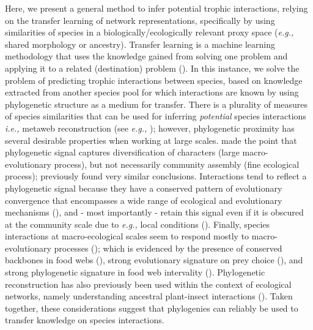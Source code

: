 \begin{refsection}
Here, we present a general method to infer potential trophic
interactions, relying on the transfer learning of network
representations, specifically by using similarities of species in a
biologically/ecologically relevant proxy space (\emph{e.g.,} shared
morphology or ancestry). Transfer learning is a machine learning
methodology that uses the knowledge gained from solving one problem and
applying it to a related (destination) problem (\cite{Torrey2010Transfer,
Pan2010Survey}). In this instance, we solve the problem of predicting
trophic interactions between species, based on knowledge extracted from
another species pool for which interactions are known by using
phylogenetic structure as a medium for transfer. There is a plurality of
measures of species similarities that can be used for inferring
\emph{potential} species interactions \emph{i.e.,} metaweb reconstruction
(see \emph{e.g.,} \cite{Morales-Castilla2015Inferring}); however, phylogenetic
proximity has several desirable properties when working at large scales.
\cite{Gerhold2015Phylogenetic} made the point that phylogenetic signal captures
diversification of characters (large macro-evolutionary process), but
not necessarily community assembly (fine ecological process);
\cite{Dormann2010Evolution} previously found very similar conclusions.
Interactions tend to reflect a phylogenetic signal because they have a
conserved pattern of evolutionary convergence that encompasses a wide
range of ecological and evolutionary mechanisms (\cite{Mouquet2012Ecophylogenetics, Cavender-Bares2009Merging}), and - most importantly - retain this
signal even if it is obscured at the community scale due to \emph{e.g.,}
local conditions (\cite{Poisot2018Interactions, Hutchinson2017Cophylogenetic}).
Finally, species interactions at macro-ecological scales seem to respond
mostly to macro-evolutionary processes (\cite{Price2003Macroevolutionary}); which is
evidenced by the presence of conserved backbones in food webs
(\cite{BramonMora2018Identifying, DallaRiva2016Exploring}), strong evolutionary
signature on prey choice (\cite{Stouffer2012Evolutionary}), and strong
phylogenetic signature in food web intervality (\cite{Eklof2016Phylogenetic}).
Phylogenetic reconstruction has also previously been used within the
context of ecological networks, namely understanding ancestral
plant-insect interactions (\cite{Braga2021Phylogenetic}). Taken together, these
considerations suggest that phylogenies can reliably be used to transfer
knowledge on species interactions.


\end{refsection}
